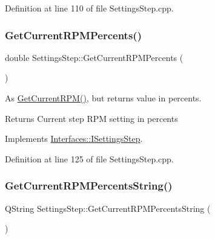 Definition at line 110 of file Settings\+Step.\+cpp.

\mbox{\label{class_settings_step_a35bea9115637a0c848e8f827f2353c11}} 
\subsubsection{\texorpdfstring{Get\+Current\+R\+P\+M\+Percents()}{GetCurrentRPMPercents()}}
{\footnotesize\ttfamily double Settings\+Step\+::\+Get\+Current\+R\+P\+M\+Percents (\begin{DoxyParamCaption}{ }\end{DoxyParamCaption})\hspace{0.3cm}{\ttfamily [virtual]}}



As \hyperlink{class_settings_step_aaba560b593af9bc96eeed3db01a469f4}{Get\+Current\+R\+P\+M()}, but returns value in percents. 

\begin{DoxyReturn}{Returns}
Current step R\+PM setting in percents 
\end{DoxyReturn}


Implements \hyperlink{class_interfaces_1_1_i_settings_step_abbbb49e91352212c6201a85f1a22253f}{Interfaces\+::\+I\+Settings\+Step}.



Definition at line 125 of file Settings\+Step.\+cpp.

\mbox{\label{class_settings_step_a21e452401e180d6e114561a8b05ab1ae}} 
\subsubsection{\texorpdfstring{Get\+Current\+R\+P\+M\+Percents\+String()}{GetCurrentRPMPercentsString()}}
{\footnotesize\ttfamily Q\+String Settings\+Step\+::\+Get\+Current\+R\+P\+M\+Percents\+String (\begin{DoxyParamCaption}{ }\end{DoxyParamCaption})\hspace{0.3cm}{\ttfamily [virtual]}}



